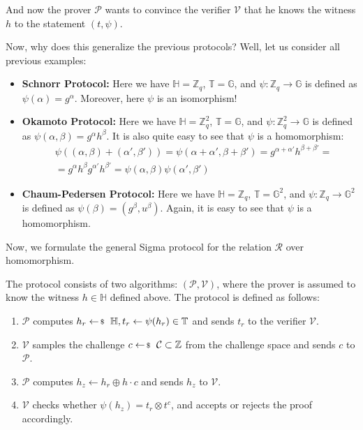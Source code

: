 \documentclass[../../book.tex]{subfiles}
\begin{document}
And now the prover $\mathcal{P}$ wants to convince the verifier $\mathcal{V}$ that he knows the witness $h$ to the statement $(t,\psi)$. 
\begin{proposition}
    Now, why does this generalize the previous protocols? Well, let us consider all previous examples:
    \begin{itemize}
        \item \textbf{Schnorr Protocol:} Here we have $\mathbb{H} = \mathbb{Z}_q$, $\mathbb{T} = \mathbb{G}$, and $\psi: \mathbb{Z}_q \to \mathbb{G}$ is defined as $\psi(\alpha) = g^{\alpha}$. Moreover, here $\psi$ is an isomorphism!
        \item \textbf{Okamoto Protocol:} Here we have $\mathbb{H} = \mathbb{Z}_q^2$, $\mathbb{T} = \mathbb{G}$, and $\psi: \mathbb{Z}_q^2 \to \mathbb{G}$ is defined as $\psi(\alpha,\beta) = g^{\alpha}h^{\beta}$. It is also quite easy to see that $\psi$ is a homomorphism:
        \begin{equation*}
            \begin{aligned}
                &\psi((\alpha,\beta) + (\alpha',\beta')) = \psi(\alpha+\alpha',\beta+\beta') = g^{\alpha+\alpha'}h^{\beta+\beta'} = \\ 
                &= g^{\alpha}h^{\beta}g^{\alpha'}h^{\beta'} = \psi(\alpha,\beta)\psi(\alpha',\beta')                
            \end{aligned}
        \end{equation*}
        \item \textbf{Chaum-Pedersen Protocol:} Here we have $\mathbb{H} = \mathbb{Z}_q$, $\mathbb{T} = \mathbb{G}^2$, and $\psi: \mathbb{Z}_q \to \mathbb{G}^2$ is defined as $\psi(\beta) = (g^{\beta},u^{\beta})$. Again, it is easy to see that $\psi$ is a homomorphism.
    \end{itemize}
\end{proposition}

Now, we formulate the general Sigma protocol for the relation $\mathcal{R}$ over homomorphism.

\begin{definition}
    The protocol consists of two algorithms: $(\mathcal{P}, \mathcal{V})$, where the prover is assumed to know the witness $h \in \mathbb{H}$ defined above. The protocol is defined as follows:
    \begin{enumerate}
        \item $\mathcal{P}$ computes $h_r \leftarrowS \mathbb{H}, t_r \gets \psi(h_r) \in \mathbb{T}$ and sends $t_r$ to the verifier $\mathcal{V}$.
        \item $\mathcal{V}$ samples the challenge $c \leftarrowS \mathcal{C} \subset \mathbb{Z}$ from the challenge space and sends $c$ to $\mathcal{P}$.
        \item $\mathcal{P}$ computes $h_z \gets h_r \oplus h\cdot c$ and sends $h_z$ to $\mathcal{V}$.
        \item $\mathcal{V}$ checks whether $\psi(h_z) = t_r \otimes t^c$, and accepts or rejects the proof accordingly.
    \end{enumerate}
\end{definition}
\end{document}
